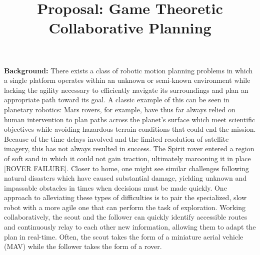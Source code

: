 \documentclass{article}
\title{Proposal: Game Theoretic Collaborative Planning}
\begin{document}
\pagestyle{fancy}
\fancyhf{}

\maketitle
\thispagestyle{fancy}

\textbf{Background:} There exists a class of robotic motion planning problems in which a single platform operates within an unknown or semi-known environment while lacking the agility necessary to efficiently navigate its surroundings and plan an appropriate path toward its goal. A classic example of this can be seen in planetary robotics: Mars rovers, for example, have thus far always relied on human intervention to plan paths across the planet’s surface which meet scientific objectives while avoiding hazardous terrain conditions that could end the mission. Because of the time delays involved and the limited resolution of satellite imagery, this has not always resulted in success. The Spirit rover entered a region of soft sand in which it could not gain traction, ultimately marooning it in place [ROVER FAILURE]. Closer to home, one might see similar challenges following natural disasters which have caused substantial damage, yielding unknown and impassable obstacles in times when decisions must be made quickly. One approach to alleviating these types of difficulties is to pair the specialized, slow robot with a more agile one that can perform the task of exploration. Working collaboratively, the scout and the follower can quickly identify accessible routes and continuously relay to each other new information, allowing them to adapt the plan in real-time. Often, the scout takes the form of a miniature aerial vehicle (MAV) while the follower takes the form of a rover.

\printbibliography
\end{document}
